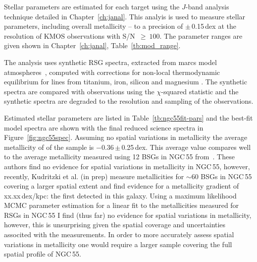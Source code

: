 Stellar parameters are estimated for each target using the $J$-band analysis technique detailed in Chapter~\ref{ch:janal}.
This analyis is used to measure stellar parameters, including overall metallicity -- to a precision of $\pm$\,0.15\,dex at the resolution of KMOS observations with S/N~$\ge~100$.
The parameter ranges are given shown in Chapter~\ref{ch:janal}, Table~\ref{tb:mod_range}.

The analysis uses synthetic RSG spectra, extracted from {\sc marcs} model atmospheres~\citep{2008A&A...486..951G},
computed with corrections for non-local thermodynamic equilibrium for lines from titanium, iron, silicon and magnesium
\citep{2012ApJ...751..156B,2013ApJ...764..115B,2015ApJ...804..113B}.
The synthetic spectra are compared with observations using the $\chi$-squared statistic and the synthetic spectra are degraded to the resolution and sampling of the observations.

Estimated stellar parameters are listed in Table~\ref{tb:ngc55fit-pars} and the best-fit model spectra are shown with the final reduced science spectra in Figure~\ref{fig:ngc55spec}.
Assuming no spatial variations in metallicity the average metallicity of of the sample is $-$0.36\,$\pm$\,0.25\,dex.
This average value compares well to the average metallicity measured using 12 BSGs in NGC\,55 from~\citep[$-$0.4\,$\pm$\,0.13]{2012A&A...542A..79C}.
These authors find no evidence for spatial variations in metallicity in NGC\,55, however, recently, Kudritzki et al. (in prep) measure metallicities for $\sim$60 BSGs in NGC\,55 covering a larger spatial extent and find evidence for a metallicity gradient of xx.xx\,dex/kpc: the first detected in this galaxy.
Using a maximum likelihood MCMC parameter estimation for a linear fit to the metallicities measured for RSGs in NGC\,55 I find (thus far) no evidence for spatial variations in metallicity, however, this is unsurprising given the spatial coverage and uncertainties associted with the measurements.
In order to more accurately assess spatial variations in metallicity one would require a larger sample covering the full spatial profile of NGC\,55.


